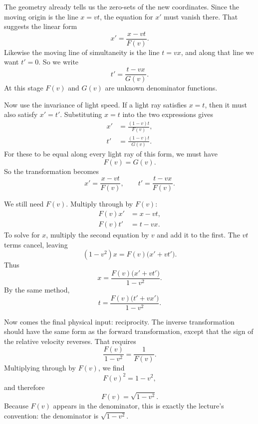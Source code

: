 The geometry already tells us the zero-sets of the new coordinates. Since the moving origin is the line \(x=vt\), the equation for \(x'\) must vanish there. That suggests the linear form
\begin{equation}
x'=\frac{x-vt}{F(v)}.
\end{equation}
Likewise the moving line of simultaneity is the line \(t=vx\), and along that line we want \(t'=0\). So we write
\begin{equation}
t'=\frac{t-vx}{G(v)}.
\end{equation}
At this stage \(F(v)\) and \(G(v)\) are unknown denominator functions.

Now use the invariance of light speed. If a light ray satisfies \(x=t\), then it must also satisfy \(x'=t'\). Substituting \(x=t\) into the two expressions gives
\begin{align}
x' &= \frac{(1-v)t}{F(v)}, \\
t' &= \frac{(1-v)t}{G(v)}.
\end{align}
For these to be equal along every light ray of this form, we must have
\begin{equation}
F(v)=G(v).
\end{equation}
So the transformation becomes
\begin{equation}
x'=\frac{x-vt}{F(v)},\qquad t'=\frac{t-vx}{F(v)}.
\end{equation}

We still need \(F(v)\). Multiply through by \(F(v)\):
\begin{align}
F(v)x' &= x-vt, \\
F(v)t' &= t-vx.
\end{align}
To solve for \(x\), multiply the second equation by \(v\) and add it to the first. The \(vt\) terms cancel, leaving
\begin{equation}
(1-v^2)x=F(v)\bigl(x'+vt'\bigr).
\end{equation}
Thus
\begin{equation}
x=\frac{F(v)\bigl(x'+vt'\bigr)}{1-v^2}.
\end{equation}
By the same method,
\begin{equation}
t=\frac{F(v)\bigl(t'+vx'\bigr)}{1-v^2}.
\end{equation}

Now comes the final physical input: reciprocity. The inverse transformation should have the same form as the forward transformation, except that the sign of the relative velocity reverses. That requires
\begin{equation}
\frac{F(v)}{1-v^2}=\frac{1}{F(v)}.
\end{equation}
Multiplying through by \(F(v)\), we find
\begin{equation}
F(v)^2=1-v^2,
\end{equation}
and therefore
\begin{equation}
F(v)=\sqrt{1-v^2}.
\end{equation}
Because \(F(v)\) appears in the denominator, this is exactly the lecture's convention: the denominator is \(\sqrt{1-v^2}\).

